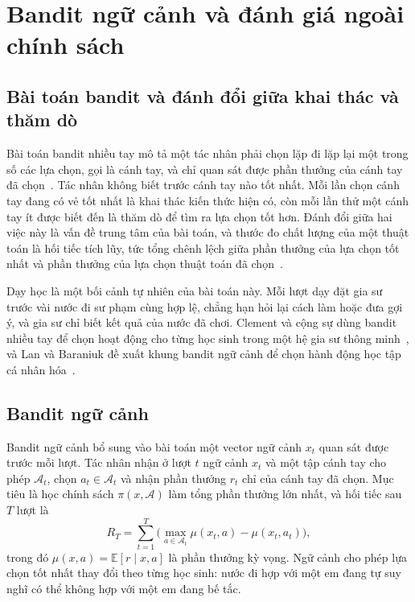 \section{Bandit ngữ cảnh và đánh giá ngoài chính sách}

\subsection{Bài toán bandit và đánh đổi giữa khai thác và thăm dò}
Bài toán bandit nhiều tay mô tả một tác nhân phải chọn lặp đi lặp lại một trong số các lựa chọn, gọi là cánh tay, và chỉ quan sát được phần thưởng của cánh tay đã chọn~\cite{auer2002}. Tác nhân không biết trước cánh tay nào tốt nhất. Mỗi lần chọn cánh tay đang có vẻ tốt nhất là khai thác kiến thức hiện có, còn mỗi lần thử một cánh tay ít được biết đến là thăm dò để tìm ra lựa chọn tốt hơn. Đánh đổi giữa hai việc này là vấn đề trung tâm của bài toán, và thước đo chất lượng của một thuật toán là hối tiếc tích lũy, tức tổng chênh lệch giữa phần thưởng của lựa chọn tốt nhất và phần thưởng của lựa chọn thuật toán đã chọn~\cite{lattimore2020}.

Dạy học là một bối cảnh tự nhiên của bài toán này. Mỗi lượt dạy đặt gia sư trước vài nước đi sư phạm cùng hợp lệ, chẳng hạn hỏi lại cách làm hoặc đưa gợi ý, và gia sư chỉ biết kết quả của nước đã chơi. Clement và cộng sự dùng bandit nhiều tay để chọn hoạt động cho từng học sinh trong một hệ gia sư thông minh~\cite{clement2015}, và Lan và Baraniuk đề xuất khung bandit ngữ cảnh để chọn hành động học tập cá nhân hóa~\cite{lan2016}.

\subsection{Bandit ngữ cảnh}
Bandit ngữ cảnh bổ sung vào bài toán một vector ngữ cảnh $x_t$ quan sát được trước mỗi lượt. Tác nhân nhận ở lượt $t$ ngữ cảnh $x_t$ và một tập cánh tay cho phép $\mathcal{A}_t$, chọn $a_t\in\mathcal{A}_t$ và nhận phần thưởng $r_t$ chỉ của cánh tay đã chọn. Mục tiêu là học chính sách $\pi(x,\mathcal{A})$ làm tổng phần thưởng lớn nhất, và hối tiếc sau $T$ lượt là
\begin{equation}
R_T=\sum_{t=1}^{T}\Big(\max_{a\in\mathcal{A}_t}\mu(x_t,a)-\mu(x_t,a_t)\Big),
\label{eq:regret}
\end{equation}
trong đó $\mu(x,a)=\mathbb{E}[r\mid x,a]$ là phần thưởng kỳ vọng. Ngữ cảnh cho phép lựa chọn tốt nhất thay đổi theo từng học sinh: nước đi hợp với một em đang tự suy nghĩ có thể không hợp với một em đang bế tắc.

